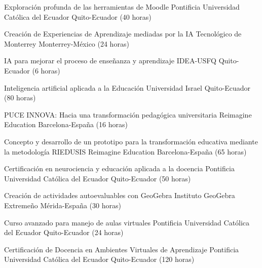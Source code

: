 \documentclass[
	a4paper,
	maincolor=cvblue!70!blue,
	sidecolor=gray!30,
	sectioncolor=cvblue!70!blue,
    sidebarwidth=7.5cm,
	topbottommargin=20pt,
	leftrightmargin=20pt,
]{fortysecondscv}
\begin{document}


    {Exploración profunda de las herramientas de Moodle}
    {Pontificia Universidad Católica del Ecuador}
    {Quito-Ecuador (40 horas)}

    {Creación de Experiencias de Aprendizaje mediadas por la IA}
    {Tecnológico de Monterrey}
    {Monterrey-México (24 horas)}

    {IA para mejorar el proceso de enseñanza y aprendizaje}
    {IDEA-USFQ}
    {Quito-Ecuador (6 horas)}

    {Inteligencia artificial aplicada a la Educación}
    {Universidad Israel}
    {Quito-Ecuador (80 horas)}

    {PUCE INNOVA: Hacia una transformación pedagógica universitaria}
    {Reimagine Education}
    {Barcelona-España (16 horas)}

    {Concepto y desarrollo de un prototipo para la transformación educativa mediante la metodología RIEDUSIS}
    {Reimagine Education}
    {Barcelona-España (65 horas)}

    {Certificación en neurociencia y educación aplicada a la docencia}
    {Pontificia Universidad Católica del Ecuador}
    {Quito-Ecuador (50 horas)}

    {Creación de actividades autoevaluables con GeoGebra}
    {Instituto GeoGebra Extremeño}
    {Mérida-España (30 horas)}

    {Curso avanzado para manejo de aulas virtuales}
    {Pontificia Universidad Católica del Ecuador}
    {Quito-Ecuador (24 horas)}

    {Certificación de Docencia en Ambientes Virtuales de Aprendizaje}
    {Pontificia Universidad Católica del Ecuador}
    {Quito-Ecuador (120 horas)}


\end{document}
